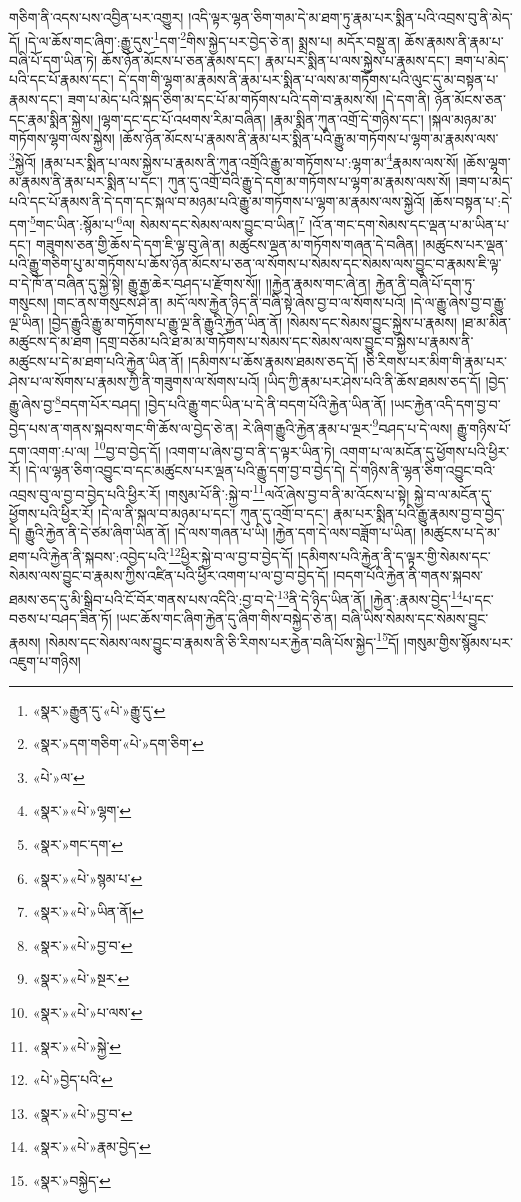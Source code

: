 གཅིག་ནི་འདས་པས་འབྱིན་པར་འགྱུར། །འདི་ལྟར་ལྷན་ཅིག་གམ་དེ་མ་ཐག་ཏུ་རྣམ་པར་སྨིན་པའི་འབྲས་བུ་ནི་མེད་དོ། །དེ་ལ་ཆོས་གང་ཞིག་:རྒྱུ་དུས་\footnote{«སྣར་»རྒྱུན་དུ་«པེ་»རྒྱུ་དུ་}དག་\footnote{«སྣར་»དག་གཅིག་«པེ་»དག་ཅིག་}གིས་སྐྱེད་པར་བྱེད་ཅེ་ན། སྨྲས་པ། མདོར་བསྡུ་ན། ཆོས་རྣམས་ནི་རྣམ་པ་བཞི་པོ་དག་ཡིན་ཏེ། ཆོས་ཉོན་མོངས་པ་ཅན་རྣམས་དང་། རྣམ་པར་སྨིན་པ་ལས་སྐྱེས་པ་རྣམས་དང་། ཟག་པ་མེད་པའི་དང་པོ་རྣམས་དང་། དེ་དག་གི་ལྷག་མ་རྣམས་ནི་རྣམ་པར་སྨིན་པ་ལས་མ་གཏོགས་པའི་ལུང་དུ་མ་བསྟན་པ་རྣམས་དང་། ཟག་པ་མེད་པའི་སྐད་ཅིག་མ་དང་པོ་མ་གཏོགས་པའི་དགེ་བ་རྣམས་སོ། །དེ་དག་ནི། ཉོན་མོངས་ཅན་དང་རྣམ་སྨིན་སྐྱེས། །ལྷག་དང་དང་པོ་འཕགས་རིམ་བཞིན། །རྣམ་སྨིན་ཀུན་འགྲོ་དེ་གཉིས་དང་། །སྐལ་མཉམ་མ་གཏོགས་ལྷག་ལས་སྐྱེས། །ཆོས་ཉོན་མོངས་པ་རྣམས་ནི་རྣམ་པར་སྨིན་པའི་རྒྱུ་མ་གཏོགས་པ་ལྷག་མ་རྣམས་ལས་\footnote{«པེ་»ལ་}སྐྱེའོ། །རྣམ་པར་སྨིན་པ་ལས་སྐྱེས་པ་རྣམས་ནི་ཀུན་འགྲོའི་རྒྱུ་མ་གཏོགས་པ་:ལྷག་མ་\footnote{«སྣར་»«པེ་»ལྷག་}རྣམས་ལས་སོ། །ཆོས་ལྷག་མ་རྣམས་ནི་རྣམ་པར་སྨིན་པ་དང་། ཀུན་དུ་འགྲོ་བའི་རྒྱུ་དེ་དག་མ་གཏོགས་པ་ལྷག་མ་རྣམས་ལས་སོ། །ཟག་པ་མེད་པའི་དང་པོ་རྣམས་ནི་དེ་དག་དང་སྐལ་བ་མཉམ་པའི་རྒྱུ་མ་གཏོགས་པ་ལྷག་མ་རྣམས་ལས་སྐྱེའོ། །ཆོས་བསྟན་པ་:དེ་དག་\footnote{«སྣར་»གང་དག་}གང་ཡིན་:སྙོམ་པ་\footnote{«སྣར་»«པེ་»སྙམ་པ་}ལ། སེམས་དང་སེམས་ལས་བྱུང་བ་ཡིན།\footnote{«སྣར་»«པེ་»ཡིན་ནོ།} །འོ་ན་གང་དག་སེམས་དང་ལྡན་པ་མ་ཡིན་པ་དང་། གཟུགས་ཅན་གྱི་ཆོས་དེ་དག་ཇི་ལྟ་བུ་ཞེ་ན། མཚུངས་ལྡན་མ་གཏོགས་གཞན་དེ་བཞིན། །མཚུངས་པར་ལྡན་པའི་རྒྱུ་གཅིག་པུ་མ་གཏོགས་པ་ཆོས་ཉོན་མོངས་པ་ཅན་ལ་སོགས་པ་སེམས་དང་སེམས་ལས་བྱུང་བ་རྣམས་ཇི་ལྟ་བ་དེ་ཁོ་ན་བཞིན་དུ་སྐྱེ་སྟེ། རྒྱུ་རྒྱ་ཆེར་བཤད་པ་རྫོགས་སོ།། །།རྐྱེན་རྣམས་གང་ཞེ་ན། རྐྱེན་ནི་བཞི་པོ་དག་ཏུ་གསུངས། །གང་ནས་གསུངས་ཤེ་ན། མདོ་ལས་རྐྱེན་ཉིད་ནི་བཞི་སྟེ་ཞེས་བྱ་བ་ལ་སོགས་པའོ། །དེ་ལ་རྒྱུ་ཞེས་བྱ་བ་རྒྱུ་ལྔ་ཡིན། །བྱེད་རྒྱུའི་རྒྱུ་མ་གཏོགས་པ་རྒྱུ་ལྔ་ནི་རྒྱུའི་རྐྱེན་ཡིན་ནོ། །སེམས་དང་སེམས་བྱུང་སྐྱེས་པ་རྣམས། །ཐ་མ་མིན་མཚུངས་དེ་མ་ཐག །དགྲ་བཅོམ་པའི་ཐ་མ་མ་གཏོགས་པ་སེམས་དང་སེམས་ལས་བྱུང་བ་སྐྱེས་པ་རྣམས་ནི་མཚུངས་པ་དེ་མ་ཐག་པའི་རྐྱེན་ཡིན་ནོ། །དམིགས་པ་ཆོས་རྣམས་ཐམས་ཅད་དོ། །ཅི་རིགས་པར་མིག་གི་རྣམ་པར་ཤེས་པ་ལ་སོགས་པ་རྣམས་ཀྱི་ནི་གཟུགས་ལ་སོགས་པའོ། །ཡིད་ཀྱི་རྣམ་པར་ཤེས་པའི་ནི་ཆོས་ཐམས་ཅད་དོ། །བྱེད་རྒྱུ་ཞེས་བྱ་\footnote{«སྣར་»«པེ་»བྱ་བ་}བདག་པོར་བཤད། །བྱེད་པའི་རྒྱུ་གང་ཡིན་པ་དེ་ནི་བདག་པོའི་རྐྱེན་ཡིན་ནོ། །ཡང་རྐྱེན་འདི་དག་བྱ་བ་བྱེད་པས་ན་གནས་སྐབས་གང་གི་ཆོས་ལ་བྱེད་ཅེ་ན། རེ་ཞིག་རྒྱུའི་རྐྱེན་རྣམ་པ་ལྔར་\footnote{«སྣར་»«པེ་»སྔར་}བཤད་པ་དེ་ལས། རྒྱུ་གཉིས་པོ་དག་འགག་:པ་ལ། \footnote{«སྣར་»«པེ་»པ་ལས་}བྱ་བ་བྱེད་དོ། །འགག་པ་ཞེས་བྱ་བ་ནི་ད་ལྟར་ཡིན་ཏེ། འགག་པ་ལ་མངོན་དུ་ཕྱོགས་པའི་ཕྱིར་རོ། །དེ་ལ་ལྷན་ཅིག་འབྱུང་བ་དང་མཚུངས་པར་ལྡན་པའི་རྒྱུ་དག་བྱ་བ་བྱེད་དེ། དེ་གཉིས་ནི་ལྷན་ཅིག་འབྱུང་བའི་འབྲས་བུ་ལ་བྱ་བ་བྱེད་པའི་ཕྱིར་རོ། །གསུམ་པོ་ནི་:སྐྱེ་བ་\footnote{«སྣར་»«པེ་»སྐྱེ་}ལའོ་ཞེས་བྱ་བ་ནི་མ་འོངས་པ་སྟེ། སྐྱེ་བ་ལ་མངོན་དུ་ཕྱོགས་པའི་ཕྱིར་རོ། །དེ་ལ་ནི་སྐལ་བ་མཉམ་པ་དང་། ཀུན་དུ་འགྲོ་བ་དང་། རྣམ་པར་སྨིན་པའི་རྒྱུ་རྣམས་བྱ་བ་བྱེད་དེ། རྒྱུའི་རྐྱེན་ནི་དེ་ཙམ་ཞིག་ཡིན་ནོ། །དེ་ལས་གཞན་པ་ཡི། །རྐྱེན་དག་དེ་ལས་བཟློག་པ་ཡིན། །མཚུངས་པ་དེ་མ་ཐག་པའི་རྐྱེན་ནི་སྐབས་:འབྱེད་པའི་\footnote{«པེ་»བྱེད་པའི་}ཕྱིར་སྐྱེ་བ་ལ་བྱ་བ་བྱེད་དོ། །དམིགས་པའི་རྐྱེན་ནི་ད་ལྟར་གྱི་སེམས་དང་སེམས་ལས་བྱུང་བ་རྣམས་ཀྱིས་འཛིན་པའི་ཕྱིར་འགག་པ་ལ་བྱ་བ་བྱེད་དོ། །བདག་པོའི་རྐྱེན་ནི་གནས་སྐབས་ཐམས་ཅད་དུ་མི་སྒྲིབ་པའི་ངོ་བོར་གནས་པས་འདིའི་:བྱ་བ་དེ་\footnote{«སྣར་»«པེ་»བྱ་བ་}ནི་དེ་ཉིད་ཡིན་ནོ། །རྐྱེན་:རྣམས་བྱེད་\footnote{«སྣར་»«པེ་»རྣམ་བྱེད་}པ་དང་བཅས་པ་བཤད་ཟིན་ཏོ། །ཡང་ཆོས་གང་ཞིག་རྐྱེན་དུ་ཞིག་གིས་བསྐྱེད་ཅེ་ན། བཞི་ཡིས་སེམས་དང་སེམས་བྱུང་རྣམས། །སེམས་དང་སེམས་ལས་བྱུང་བ་རྣམས་ནི་ཅི་རིགས་པར་རྐྱེན་བཞི་པོས་སྐྱེད་\footnote{«སྣར་»བསྐྱེད་}དོ། །གསུམ་གྱིས་སྙོམས་པར་འཇུག་པ་གཉིས། 